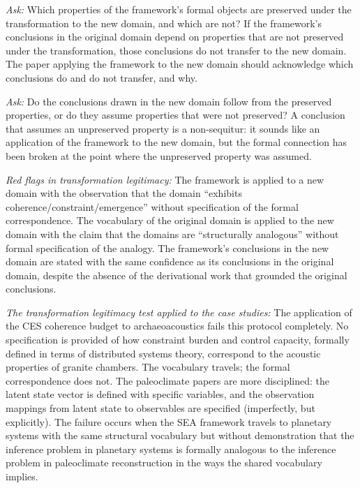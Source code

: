\documentclass[12pt, openright, twoside]{book}
\begin{document}
\textit{Ask:} Which properties of the framework's formal objects are
preserved under the transformation to the new domain, and which are
not? If the framework's conclusions in the original domain depend on
properties that are not preserved under the transformation, those
conclusions do not transfer to the new domain. The paper applying
the framework to the new domain should acknowledge which conclusions
do and do not transfer, and why.

\textit{Ask:} Do the conclusions drawn in the new domain follow from
the preserved properties, or do they assume properties that were not
preserved? A conclusion that assumes an unpreserved property is a
non-sequitur: it sounds like an application of the framework to the
new domain, but the formal connection has been broken at the point
where the unpreserved property was assumed.

\textit{Red flags in transformation legitimacy:} The framework is
applied to a new domain with the observation that the domain ``exhibits
coherence/constraint/emergence'' without specification of the formal
correspondence. The vocabulary of the original domain is applied to
the new domain with the claim that the domains are ``structurally
analogous'' without formal specification of the analogy. The framework's
conclusions in the new domain are stated with the same confidence as
its conclusions in the original domain, despite the absence of the
derivational work that grounded the original conclusions.

\textit{The transformation legitimacy test applied to the case studies:}
The application of the CES coherence budget to archaeoacoustics fails
this protocol completely. No specification is provided of how constraint
burden and control capacity, formally defined in terms of distributed
systems theory, correspond to the acoustic properties of granite chambers.
The vocabulary travels; the formal correspondence does not. The paleoclimate
papers are more disciplined: the latent state vector is defined with specific
variables, and the observation mappings from latent state to observables are
specified (imperfectly, but explicitly). The failure occurs when the SEA
framework travels to planetary systems with the same structural vocabulary
but without demonstration that the inference problem in planetary systems
is formally analogous to the inference problem in paleoclimate reconstruction
in the ways the shared vocabulary implies.
\end{document}
